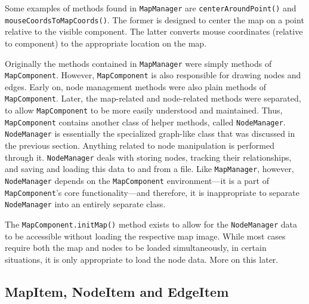 \documentclass[12pt,letterpaper,titlepage]{article}   %
\begin{document}
Some examples of methods found in \texttt{MapManager} are
\texttt{centerAroundPoint()} and \texttt{mouseCoordsToMapCoords()}.
The former is designed
to center the map on a point relative to the visible component. The
latter converts mouse coordinates (relative to component) to the
appropriate location on the map.

Originally the methods contained in \texttt{MapManager} were simply methods of
\texttt{MapComponent}. However, \texttt{MapComponent} is also responsible
for drawing
nodes and edges. Early on, node management methods were also plain
methods of \texttt{MapComponent}. Later, the map-related and
node-related methods
were separated, to allow \texttt{MapComponent} to be more easily
understood and maintained. Thus, \texttt{MapComponent} contains another
class of helper methods,
called \texttt{NodeManager}. \texttt{NodeManager} is essentially the specialized
graph-like class that was discussed in the previous section. Anything
related to node manipulation is performed through it. \texttt{NodeManager}
deals with storing nodes, tracking their relationships, and saving and loading
this data to and from a file. Like \texttt{MapManager}, however, 
\texttt{NodeManager} depends on the \texttt{MapComponent} 
environment---it is a part of \texttt{MapComponent}'s
core functionality---and therefore, it is inappropriate to separate
\texttt{NodeManager} into an entirely separate class.

The \texttt{MapComponent.initMap()} method exists to allow for the
\texttt{NodeManager}
data to be accessible without loading the respective map image. While
most cases require both the map and nodes to be loaded simultaneously,
in certain situations, it is only appropriate to load the node data.
More on this later.

\subsection{MapItem, NodeItem and EdgeItem}
\end{document}
